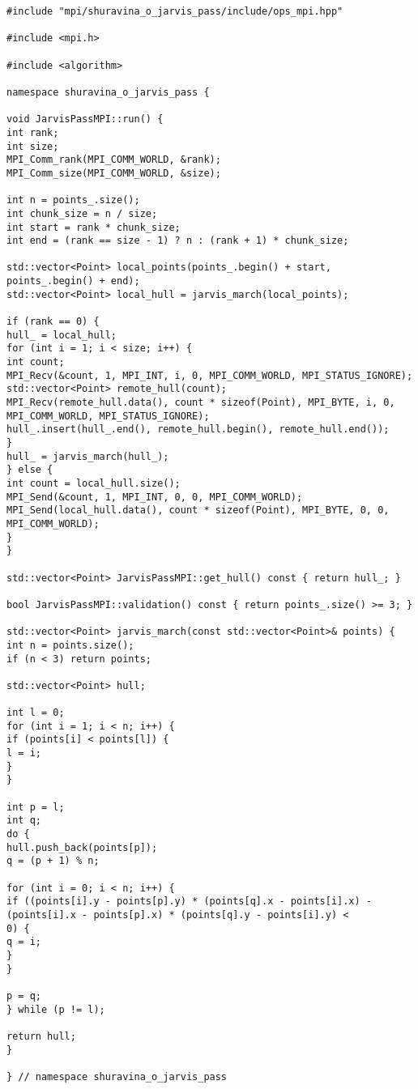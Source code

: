\documentclass[12pt]{article}
\begin{document}
\newpage

\begin{lstlisting}[caption={ops\_mpi\_.cpp}]
#include "mpi/shuravina_o_jarvis_pass/include/ops_mpi.hpp"

#include <mpi.h>

#include <algorithm>

namespace shuravina_o_jarvis_pass {

void JarvisPassMPI::run() {
int rank;
int size;
MPI_Comm_rank(MPI_COMM_WORLD, &rank);
MPI_Comm_size(MPI_COMM_WORLD, &size);

int n = points_.size();
int chunk_size = n / size;
int start = rank * chunk_size;
int end = (rank == size - 1) ? n : (rank + 1) * chunk_size;

std::vector<Point> local_points(points_.begin() + start, points_.begin() + end);
std::vector<Point> local_hull = jarvis_march(local_points);

if (rank == 0) {
hull_ = local_hull;
for (int i = 1; i < size; i++) {
int count;
MPI_Recv(&count, 1, MPI_INT, i, 0, MPI_COMM_WORLD, MPI_STATUS_IGNORE);
std::vector<Point> remote_hull(count);
MPI_Recv(remote_hull.data(), count * sizeof(Point), MPI_BYTE, i, 0, MPI_COMM_WORLD, MPI_STATUS_IGNORE);
hull_.insert(hull_.end(), remote_hull.begin(), remote_hull.end());
}
hull_ = jarvis_march(hull_);
} else {
int count = local_hull.size();
MPI_Send(&count, 1, MPI_INT, 0, 0, MPI_COMM_WORLD);
MPI_Send(local_hull.data(), count * sizeof(Point), MPI_BYTE, 0, 0, MPI_COMM_WORLD);
}
}

std::vector<Point> JarvisPassMPI::get_hull() const { return hull_; }

bool JarvisPassMPI::validation() const { return points_.size() >= 3; }

std::vector<Point> jarvis_march(const std::vector<Point>& points) {
int n = points.size();
if (n < 3) return points;

std::vector<Point> hull;

int l = 0;
for (int i = 1; i < n; i++) {
if (points[i] < points[l]) {
l = i;
}
}

int p = l;
int q;
do {
hull.push_back(points[p]);
q = (p + 1) % n;

for (int i = 0; i < n; i++) {
if ((points[i].y - points[p].y) * (points[q].x - points[i].x) -
(points[i].x - points[p].x) * (points[q].y - points[i].y) <
0) {
q = i;
}
}

p = q;
} while (p != l);

return hull;
}

} // namespace shuravina_o_jarvis_pass
\end{lstlisting}
\end{document}

